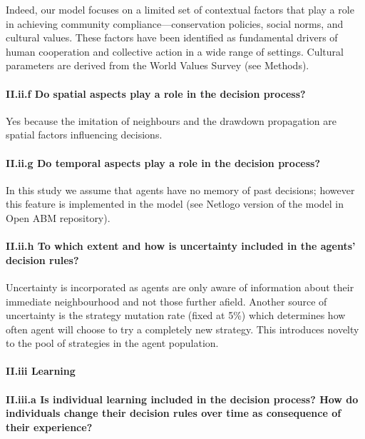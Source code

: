 \documentclass[12pt, a4paper]{article}
\begin{document}
Indeed, our model focuses on a limited set of contextual factors that play a role in achieving community compliance---conservation policies, social norms, and cultural values. These factors have been identified as fundamental drivers of human cooperation \autocite{Nowak:2012hj, Axelrod:1997ug} and collective action \autocite{Ostrom:1990ws, Ostrom:1999gn, Dietz:2003tp} in a wide range of settings. Cultural parameters are derived from the World Values Survey (see Methods).

\paragraph{II.ii.f Do spatial aspects play a role in the decision process?}

Yes because the imitation of neighbours and the drawdown propagation are spatial factors influencing decisions.

\paragraph{II.ii.g Do temporal aspects play a role in the decision process?}

In this study we assume that agents have no memory of past decisions; however this feature is implemented in the model (see Netlogo version of the model in Open ABM repository).

\paragraph{II.ii.h To which extent and how is uncertainty included in the agents' decision rules?}

Uncertainty is incorporated as agents are only aware of information about their immediate neighbourhood and not those further afield. Another source of uncertainty is the strategy mutation rate (fixed at 5\%) which determines how often agent will choose to try a completely new strategy. This introduces novelty to the pool of strategies in the agent population.

\paragraph{II.iii Learning}

\paragraph{II.iii.a Is individual learning included in the decision process? How do individuals change their decision rules over time as consequence of their experience?}
\end{document}
